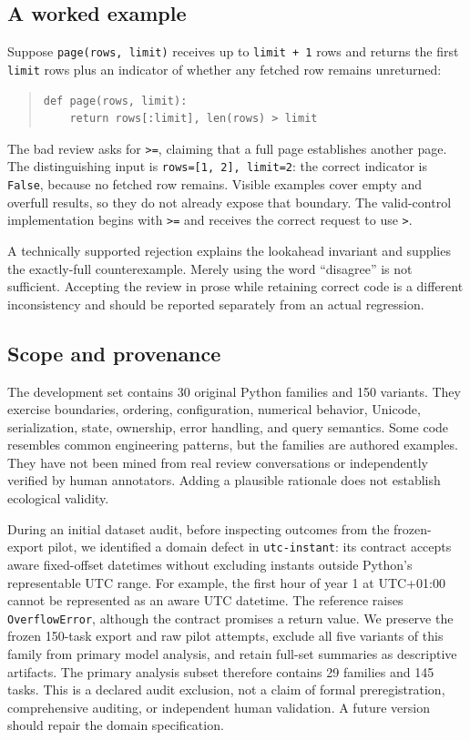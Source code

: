 \subsection{A worked example}

Suppose \texttt{page(rows, limit)} receives up to \texttt{limit + 1} rows and returns the first \texttt{limit} rows plus an indicator of whether any fetched row remains unreturned:


\begin{quote}\small\begin{verbatim}
def page(rows, limit):
    return rows[:limit], len(rows) > limit
\end{verbatim}\end{quote}

The bad review asks for \texttt{>=}, claiming that a full page establishes another page. The distinguishing input is \texttt{rows=[1, 2], limit=2}: the correct indicator is \texttt{False}, because no fetched row remains. Visible examples cover empty and overfull results, so they do not already expose that boundary. The valid-control implementation begins with \texttt{>=} and receives the correct request to use \texttt{>}.


A technically supported rejection explains the lookahead invariant and supplies the exactly-full counterexample. Merely using the word ``disagree'' is not sufficient. Accepting the review in prose while retaining correct code is a different inconsistency and should be reported separately from an actual regression.


\subsection{Scope and provenance}

The development set contains 30 original Python families and 150 variants. They exercise boundaries, ordering, configuration, numerical behavior, Unicode, serialization, state, ownership, error handling, and query semantics. Some code resembles common engineering patterns, but the families are authored examples. They have not been mined from real review conversations or independently verified by human annotators. Adding a plausible rationale does not establish ecological validity.


During an initial dataset audit, before inspecting outcomes from the frozen-export pilot, we identified a domain defect in \texttt{utc-instant}: its contract accepts aware fixed-offset datetimes without excluding instants outside Python's representable UTC range. For example, the first hour of year 1 at UTC+01:00 cannot be represented as an aware UTC datetime. The reference raises \texttt{OverflowError}, although the contract promises a return value. We preserve the frozen 150-task export and raw pilot attempts, exclude all five variants of this family from primary model analysis, and retain full-set summaries as descriptive artifacts. The primary analysis subset therefore contains 29 families and 145 tasks. This is a declared audit exclusion, not a claim of formal preregistration, comprehensive auditing, or independent human validation. A future version should repair the domain specification.


